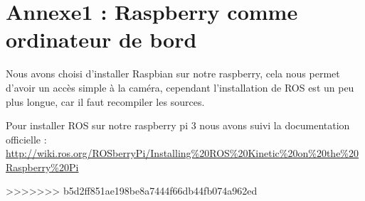\documentclass[12pt, openany]{report}
\begin{document}
\section*{Annexe1 : Raspberry comme ordinateur de bord}

Nous avons choisi d'installer Raspbian sur notre raspberry, cela nous permet d'avoir un accès simple à la caméra, cependant l'installation de ROS est un peu plus longue, car il faut recompiler les sources.

Pour installer ROS sur notre raspberry pi 3 nous avons suivi la documentation officielle :  \url{http://wiki.ros.org/ROSberryPi/Installing%20ROS%20Kinetic%20on%20the%20Raspberry%20Pi}


>>>>>>> b5d2ff851ae198be8a7444f66db44fb074a962ed

\pagebreak
\listoffigures
\end{document}
